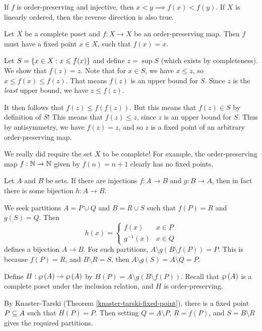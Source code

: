 \documentclass{article}
\begin{document}
\begin{corollary}
	If $f$ is order-preserving and injective, then $x < y \implies f(x) < f(y)$. If $X$ is linearly ordered, then the reverse direction is also true.
\end{corollary}

\begin{theorem}
	\label{knaster-tarski-fixed-point}
    Let $X$ be a complete poset and $f : X \to X$ be an order-preserving map. Then $f$ must have a fixed point $x \in X$, such that $f(x) = x$.
\end{theorem}

\begin{prf}
    Let $S = \left\lbrace x \in X : x \leqslant f(x) \right\rbrace$ and define $z = \sup S$ (which exists by completeness). We show that $f(z) = z$. Note that for $x \in S$, we have $x \leq z$, so $x \leq f(x) \leq f(z)$. That means $f(z)$ is an upper bound for $S$. Since $z$ is the \textit{least} upper bound, we have $z \leq f(z)$.
    
    It then follows that $f(z) \leq f(f(z))$. But this means that $f(z) \in S$ by definition of $S$! This means that $f(z) \leq z$, since $z$ is an upper bound for $S$. Thus by antisymmetry, we have $f(z) = z$, and so $z$ is a fixed point of an arbitrary order-preserving map.
\end{prf}

\begin{note}
	We really did require the set $X$ to be complete! For example, the order-preserving map $f: \mathbb{N} \to \mathbb{N}$ given by $f(n) = n+1$ clearly has no fixed points.
\end{note}

\begin{theorem}
    Let $A$ and $B$ be sets. If there are injections $f: A \to B$ and $g: B \to A$, then in fact there is some bijection $h: A \to B$.
\end{theorem}

\begin{prf}
    We seek partitions $A = P \cup Q$ and $B = R \cup S$ such that $f(P) = R$ and $g(S) = Q$. Then
    \[
	h(x) = \begin{cases}
		f(x) & x \in P \\
		g^{-1}(x) & x \in Q
	\end{cases}
	\]
	defines a bijection $A \to B$. For such partitions, $A \setminus g(B \setminus f(P)) = P$. This is because $f(P) = R$, and $B \setminus R = S$, then $A \setminus g(S) = A \setminus Q = P$.
	
	Define $H : \wp\left(A\right) \to \wp\left(A\right)$ by $H(P) = A \setminus g(B \setminus f(P))$. Recall that $\wp\left(A\right)$ is a complete poset under the inclusion relation, and $H$ is order-preserving.
	
	By Knaster-Tarski (Theorem \ref{knaster-tarski-fixed-point}), there is a fixed point $P \subseteq A$ such that $H(P) = P$. Then setting $Q = A \setminus P$, $R = f(P)$, and $S = B \setminus R$ gives the required partitions.
\end{prf}
\end{document}
